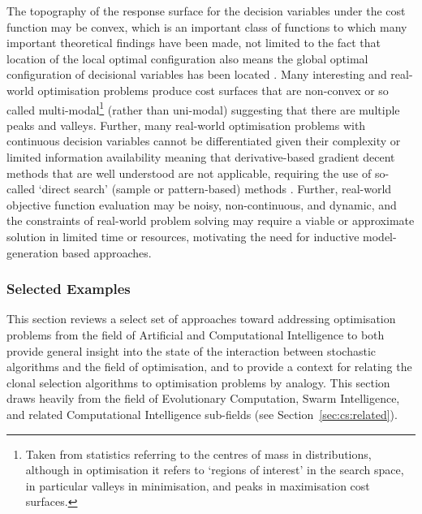 The topography of the response surface for the decision variables under the cost function may be convex, which is an important class of functions to which many important theoretical findings have been made, not limited to the fact that location of the local optimal configuration also means the global optimal configuration of decisional variables has been located \cite{Boyd2004}. Many interesting and real-world optimisation problems produce cost surfaces that are non-convex or so called multi-modal\footnote{Taken from statistics referring to the centres of mass in distributions, although in optimisation it refers to `regions of interest' in the search space, in particular valleys in minimisation, and peaks in maximisation cost surfaces.} (rather than uni-modal) suggesting that there are multiple peaks and valleys. Further, many real-world optimisation problems with continuous decision variables cannot be differentiated given their complexity or limited information availability meaning that derivative-based gradient decent methods that are well understood are not applicable, requiring the use of so-called `direct search' (sample or pattern-based) methods \cite{Lewis2000}. Further, real-world objective function evaluation may be noisy, non-continuous, and dynamic, and the constraints of real-world problem solving may require a viable or approximate solution in limited time or resources, motivating the need for inductive model-generation based approaches.

%
%
\subsubsection{Selected Examples}
This section reviews a select set of approaches toward addressing optimisation problems from the field of Artificial and Computational Intelligence to both provide general insight into the state of the interaction between stochastic algorithms and the field of optimisation, and to provide a context for relating the clonal selection algorithms to optimisation problems by analogy. This section draws heavily from the field of Evolutionary Computation, Swarm Intelligence, and related Computational Intelligence sub-fields (see Section~\ref{sec:cs:related}).

